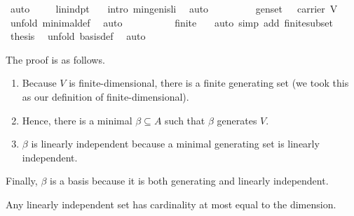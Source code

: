 \begin{isabellebody}
\ auto\isanewline
\ \ \isamarkupfalse%
\ {}{\isacharcolon}\ {\isachardoublequoteopen}lin{\isacharunderscore}indpt\ {\isasymbeta}{\isachardoublequoteclose}\ \isamarkupfalse%
\ {\isacharparenleft}intro\ min{\isacharunderscore}gen{\isacharunderscore}is{\isacharunderscore}li{\isacharparenright}\ \isamarkupfalse%
\ auto\isanewline
\ \ \isamarkupfalse%
\ \isamarkupfalse%
\ {}\ \isamarkupfalse%
\ {}{\isacharcolon}\ {\isachardoublequoteopen}gen{\isacharunderscore}set\ {\isasymbeta}\ {\isasymand}\ {\isasymbeta}{\isasymsubseteq}carrier\ V{\isachardoublequoteclose}\ \isamarkupfalse%
\ {\isacharparenleft}unfold\ minimal{\isacharunderscore}def{\isacharparenright}\ \isamarkupfalse%
\ auto\isanewline
\ \ \isamarkupfalse%
\ \isamarkupfalse%
\ {}\ {}\ \isamarkupfalse%
\ {}{\isacharcolon}\ {\isachardoublequoteopen}finite\ {\isasymbeta}{\isachardoublequoteclose}\ \isamarkupfalse%
\ {\isacharparenleft}auto\ simp\ add{\isacharcolon}\ finite{\isacharunderscore}subset{\isacharparenright}\isanewline
\ \ \isamarkupfalse%
\ \isamarkupfalse%
\ {\isacharquery}thesis\ \isamarkupfalse%
\ {\isacharparenleft}unfold\ basis{\isacharunderscore}def{\isacharparenright}\ \isamarkupfalse%
\ auto\isanewline
{}\isamarkupfalse%
%
\endisatagproof
{\isafoldproof}%
%
\isadelimproof
%
\endisadelimproof
%
\begin{isamarkuptext}%
The proof is as follows.
\begin{enumerate}
\item Because $V$ is finite-dimensional, there is a finite generating set 
(we took this as our definition of finite-dimensional).
\item Hence, there is a minimal $\beta \subseteq A$ such that $\beta$ generates $V$.
\item $\beta$ is linearly independent because a minimal generating set is linearly independent.
\end{enumerate}
Finally, $\beta$ is a basis because it is both generating and linearly independent.%
\end{isamarkuptext}%
\isamarkuptrue%
%
\begin{isamarkuptext}%
Any linearly independent set has cardinality at most equal to the dimension.%
\end{isamarkuptext}%

\end{isabellebody}

